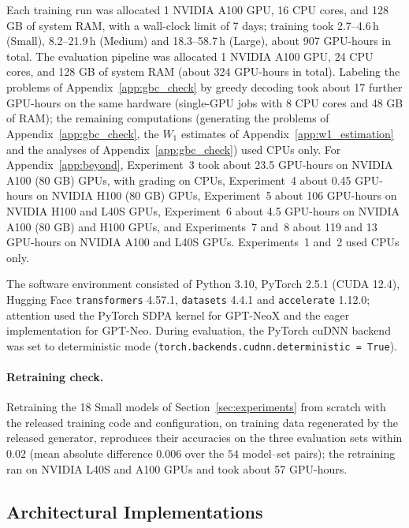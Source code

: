 Each training run was allocated 1 NVIDIA A100 GPU, 16 CPU cores, and 128 GB of system RAM, with a wall-clock limit of 7 days; training took 2.7--4.6\,h (Small), 8.2--21.9\,h (Medium) and 18.3--58.7\,h (Large), about 907 GPU-hours in total. The evaluation pipeline was allocated 1 NVIDIA A100 GPU, 24 CPU cores, and 128 GB of system RAM (about 324 GPU-hours in total). Labeling the problems of Appendix~\ref{app:gbc_check} by greedy decoding took about 17 further GPU-hours on the same hardware (single-GPU jobs with 8 CPU cores and 48 GB of RAM); the remaining computations (generating the problems of Appendix~\ref{app:gbc_check}, the $\widehat W_1$ estimates of Appendix~\ref{app:w1_estimation} and the analyses of Appendix~\ref{app:gbc_check}) used CPUs only. For Appendix~\ref{app:beyond}, Experiment~3 took about 23.5 GPU-hours on NVIDIA A100 (80 GB) GPUs, with grading on CPUs, Experiment~4 about 0.45 GPU-hours on NVIDIA H100 (80 GB) GPUs, Experiment~5 about 106 GPU-hours on NVIDIA H100 and L40S GPUs, Experiment~6 about 4.5 GPU-hours on NVIDIA A100 (80 GB) and H100 GPUs, and Experiments~7 and~8 about 119 and 13 GPU-hours on NVIDIA A100 and L40S GPUs. Experiments~1 and~2 used CPUs only. %
 
The software environment consisted of Python 3.10, PyTorch 2.5.1 (CUDA 12.4), Hugging Face \texttt{transformers} 4.57.1, \texttt{datasets} 4.4.1 and \texttt{accelerate} 1.12.0; attention used the PyTorch SDPA kernel for GPT-NeoX and the eager implementation for GPT-Neo. %
 During evaluation, the PyTorch cuDNN backend was set to deterministic mode (\texttt{torch.backends.cudnn.deterministic = True}).

\paragraph{Retraining check.}
Retraining the 18 Small models of Section~\ref{sec:experiments} from scratch with the released training code and configuration, on training data regenerated by the released generator, reproduces their accuracies on the three evaluation sets within $0.02$ (mean absolute difference $0.006$ over the $54$ model--set pairs); the retraining ran on NVIDIA L40S and A100 GPUs and took about 57 GPU-hours.

\subsection{Architectural Implementations}
\label{app:implementations}

